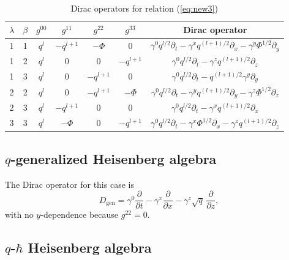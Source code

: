 \documentclass[12pt,a4paper]{article}
\theoremstyle{plain}
\theoremstyle{definition}
\begin{document}
\begin{table}[H]
\centering
\small
\caption{Dirac operators for relation (\ref{eq:new3})}
\label{tab:app-dirac-new3}
\begin{tabular}{|c|c|c|c|c|c|c|}
\hline
$\lambda$ & $\beta$ & $g^{00}$ & $g^{11}$ & $g^{22}$ & $g^{33}$ & Dirac operator \\
\hline
1 & 1 & $q^{l}$ & $-q^{l+1}$ & $-\Phi$ & $0$ & $\gamma^{0} q^{l/2}\partial_t - \gamma^{x} q^{(l+1)/2}\partial_x - \gamma^{y} \Phi^{1/2}\partial_y$ \\
\hline
1 & 2 & $q^{l}$ & $0$ & $0$ & $-q^{l+1}$ & $\gamma^{0} q^{l/2}\partial_t - \gamma^{z} q^{(l+1)/2}\partial_z$ \\
\hline
1 & 3 & $q^{l}$ & $0$ & $-q^{l+1}$ & $0$ & $\gamma^{0} q^{l/2}\partial_t - q^{(l+1)/2}\gamma^{y}\partial_y$ \\
\hline
2 & 2 & $q^{l}$ & $0$ & $-q^{l+1}$ & $-\Phi$ & $\gamma^{0} q^{l/2}\partial_t - \gamma^{y} q^{(l+1)/2}\partial_y - \gamma^{z} \Phi^{1/2}\partial_z$ \\
\hline
2 & 3 & $q^{l}$ & $-q^{l+1}$ & $0$ & $0$ & $\gamma^{0} q^{l/2}\partial_t - \gamma^{x} q^{(l+1)/2}\partial_x$ \\
\hline
3 & 3 & $q^{l}$ & $-\Phi$ & $0$ & $-q^{l+1}$ & $\gamma^{0} q^{l/2}\partial_t - \gamma^{x} \Phi^{1/2}\partial_x - \gamma^{z} q^{(l+1)/2}\partial_z$ \\
\hline
\end{tabular}
\end{table}

\subsection{$q$-generalized Heisenberg algebra}

The Dirac operator for this case is
\[
D_{\text{gen}} = \gamma^{0}\frac{\partial}{\partial t} - \gamma^{x}\frac{\partial}{\partial x} - \gamma^{z}\sqrt{q}\,\frac{\partial}{\partial z},
\]
with no $y$-dependence because $g^{22}=0$.

\subsection{$q$-$\hbar$ Heisenberg algebra}
\end{document}
